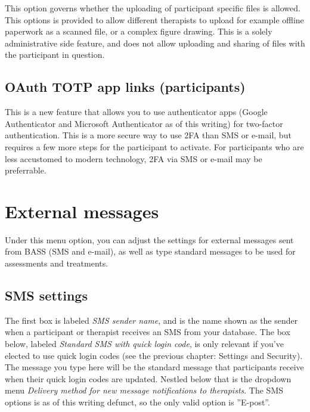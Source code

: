 \documentclass[]{book}
\begin{document}
This option governs whether the uploading of participant specific files is allowed. This options is provided to allow different therapists to upload for example offline paperwork as a scanned file, or a complex figure drawing. This is a solely administrative side feature, and does not allow uploading and sharing of files with the participant in question.

\hypertarget{oauth-totp-app-links-participants}{%
\section{OAuth TOTP app links (participants)}\label{oauth-totp-app-links-participants}}

This is a new feature that allows you to use authenticator apps (Google Authenticator and Microsoft Authenticator as of this writing) for two-factor authentication. This is a more secure way to use 2FA than SMS or e-mail, but requires a few more steps for the participant to activate. For participants who are less accustomed to modern technology, 2FA via SMS or e-mail may be preferrable.

\hypertarget{external-messages}{%
\chapter{External messages}\label{external-messages}}

Under this menu option, you can adjust the settings for external messages sent from BASS (SMS and e-mail), as well as type standard messages to be used for assessments and treatments.

\hypertarget{sms-settings}{%
\section{SMS settings}\label{sms-settings}}

The first box is labeled \emph{SMS sender name}, and is the name shown as the sender when a participant or therapist receives an SMS from your database.
The box below, labeled \emph{Standard SMS with quick login code}, is only relevant if you've elected to use quick login codes (see the previous chapter: Settings and Security). The message you type here will be the standard message that participants receive when their quick login codes are updated.
Nestled below that is the dropdown menu \emph{Delivery method for new message notifications to therapists}. The SMS options is as of this writing defunct, so the only valid option is ''E-post''.
\end{document}
